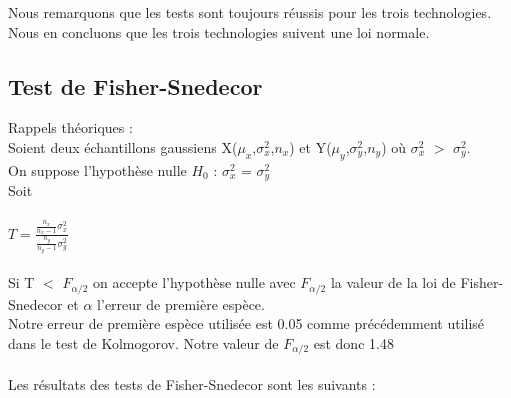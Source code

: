 \documentclass[a4paper,10pt]{article}
\begin{document}
Nous remarquons que les tests sont toujours réussis pour les trois technologies. Nous en concluons que les trois technologies suivent une loi normale.

\subsection{Test de Fisher-Snedecor}
Rappels théoriques : \\

Soient deux échantillons gaussiens X($\mu_x$,$\sigma_x^2$,$n_x$) et Y($\mu_y$,$\sigma_y^2$,$n_y$) où $\sigma_x^2$ $>$ $\sigma_y^2$.\\
On suppose l'hypothèse nulle $H_0$ : $\sigma_x^2$ = $\sigma_y^2$ \\
Soit \\
\\
\begin{math}
T = \frac{ \frac{n_x}{n_x-1} \sigma_x^2}{ \frac{n_y}{n_y-1} \sigma_y^2}
\end{math}
\\
\\
Si T $<$ $F_{\alpha/2}$ on accepte l'hypothèse nulle avec $F_{\alpha/2}$ la valeur de la loi de Fisher-Snedecor et $\alpha$ l'erreur de première espèce.\\
Notre erreur de première espèce utilisée est 0.05 comme précédemment utilisé dans le test de Kolmogorov. Notre valeur de $F_{\alpha/2}$ est donc 1.48\\
\\
Les résultats des tests de Fisher-Snedecor sont les suivants : \\
\\
\end{document}
